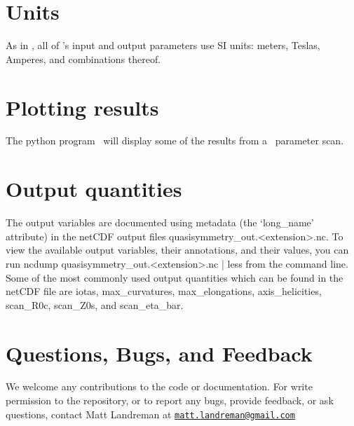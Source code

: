 \section{Units}

As in \vmec, all of \quasisymmetry's input and output parameters use SI units: meters, Teslas, Amperes, and combinations thereof.

\section{Plotting results}

The python program \quasisymmetryPlot~will display some of the results from a \quasisymmetry~parameter scan.

\section{Output quantities}

The output variables are documented using metadata (the `{\ttfamily long\_name}' attribute)
in the netCDF output files {\ttfamily quasisymmetry\_out.<extension>.nc}.
To view the available output variables, their annotations, and their values, you can run
{\ttfamily ncdump quasisymmetry\_out.<extension>.nc | less} from the command line.
Some of the most commonly used output quantities which can be found in the netCDF file are 
{\ttfamily iotas},
{\ttfamily max\_curvatures},
{\ttfamily max\_elongations},
{\ttfamily axis\_helicities},
{\ttfamily scan\_R0c},
{\ttfamily scan\_Z0s},
and
{\ttfamily scan\_eta\_bar}.

\section{Questions, Bugs, and Feedback}

We welcome any contributions to the code or documentation.
For write permission to the repository, or to report any bugs, provide feedback, or ask questions, contact Matt Landreman at
\href{mailto:matt.landreman@gmail.com}{\nolinkurl{matt.landreman@gmail.com} }






